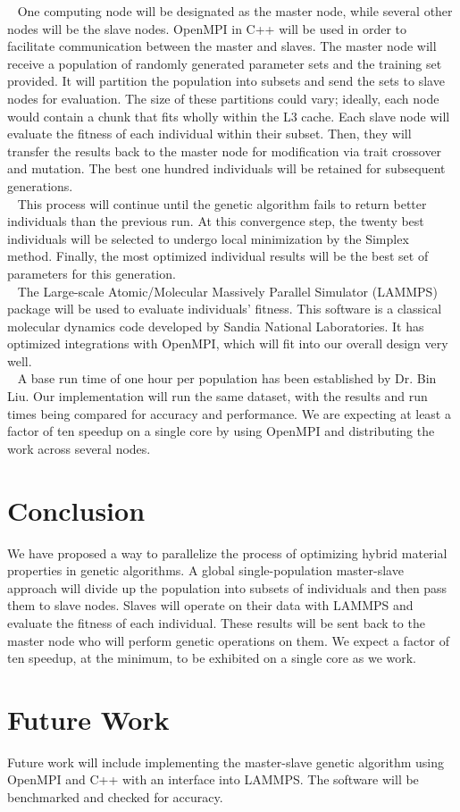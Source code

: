 \documentclass[letterpaper, 12pt]{article}
\begin{document}
\begin{flushleft}
~\newline
One computing node will be designated as the master node, while several other nodes will be the slave nodes.  OpenMPI in C++ will be used in order to facilitate communication between the master and slaves. The master node will receive a population of randomly generated parameter sets and the training set provided.  It will partition the population into subsets and send the sets to slave nodes for evaluation.  The size of these partitions could vary; ideally, each node would contain a chunk that fits wholly within the L3 cache. Each slave node will evaluate the fitness of each individual within their subset. Then, they will transfer the results back to the  master node for modification via trait crossover and mutation. The best one hundred individuals will be retained for subsequent generations.\\
~\newline 
This process will continue until the genetic algorithm fails to return better individuals than the previous run.  At this convergence step, the twenty best individuals will be selected to undergo local minimization by the Simplex method.  Finally, the most optimized individual results will be the best set of parameters for this generation. \\
~\newline
The Large-scale Atomic/Molecular Massively Parallel Simulator (LAMMPS) package will be used to evaluate individuals' fitness.  This software is a classical molecular dynamics code developed by Sandia National Laboratories.  It has optimized integrations with OpenMPI, which will fit into our overall design very well. \\
~\newline 
A base run time of one hour per population has been established by Dr. Bin Liu.  Our implementation will run the same dataset, with the results and run times being compared for accuracy and performance.  We are expecting at least a factor of ten speedup on a single core by using OpenMPI and distributing the work across several nodes.




\newpage
\section*{Conclusion}
We have proposed a way to parallelize the process of optimizing hybrid material properties in genetic algorithms.  A global single-population master-slave approach will divide up the population into subsets of individuals and then pass them to slave nodes.  Slaves will operate on their data with LAMMPS and evaluate the fitness of each individual.  These results will be sent back to the master node who will perform genetic operations on them.  We expect a factor of ten speedup, at the minimum, to be exhibited on a single core as we work.

\section*{Future Work}
Future work will include implementing the master-slave genetic algorithm using OpenMPI and C++ with an interface into LAMMPS.  The software will be benchmarked and checked for accuracy.
\newpage
\printbibliography

\end{flushleft}
\end{document}
